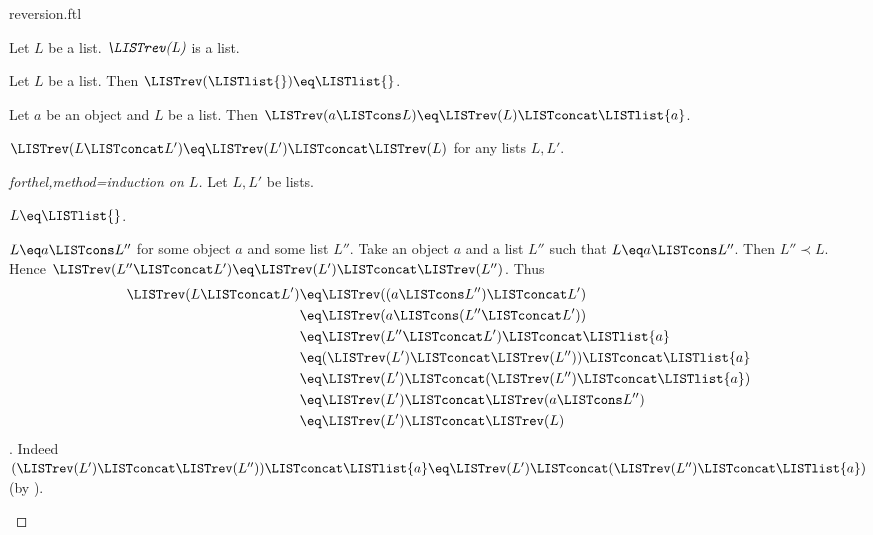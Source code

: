\documentclass{naproche-library}
\begin{document}
\begin{smodule}[title=Reversion]{reversion.ftl}

\begin{signature}[forthel,id=LISTS_REV_4578620297183232]
  Let $L$ be a list.
  $\emph{\LISTrev(L)}$ is a list.
\end{signature}

\begin{axiom}[forthel,id=LISTS_REV_3703161885818880]
  Let $L$ be a list.
  Then $\LISTrev(\LISTlist{}) \eq \LISTlist{}$.
\end{axiom}

\begin{axiom}[forthel,id=LISTS_REV_8050301789536256]
  Let $a$ be an object and $L$ be a list.
  Then $\LISTrev(a \LISTcons L) \eq \LISTrev(L) \LISTconcat \LISTlist{a}$.
\end{axiom}

\begin{proposition}[forthel,id=LISTS_REV_4512036658964875]
  $\LISTrev(L \LISTconcat L') \eq \LISTrev(L') \LISTconcat \LISTrev(L)$ for any lists $L, L'$.
\end{proposition}
\begin{proof}[forthel,method=induction on $L$]
  Let $L,L'$ be lists.

  \begin{case}{$L \eq \LISTlist{}$.} \end{case}

  \begin{case}{$L \eq a \LISTcons L''$ for some object $a$ and some list $L''$.}
    Take an object $a$ and a list $L''$ such that $L \eq a \LISTcons L''$.
    Then $L'' \prec L$.
    Hence $\LISTrev(L'' \LISTconcat L') \eq \LISTrev(L') \LISTconcat \LISTrev(L'')$.
    Thus
    \begin{align*}
      \LISTrev(L \LISTconcat L')
        &\eq \LISTrev((a \LISTcons L'') \LISTconcat L')\\
        &\eq \LISTrev(a \LISTcons (L'' \LISTconcat L'))\\
        &\eq \LISTrev(L'' \LISTconcat L') \LISTconcat \LISTlist{a}\\
        &\eq (\LISTrev(L') \LISTconcat \LISTrev(L'')) \LISTconcat \LISTlist{a}\\
        &\eq \LISTrev(L') \LISTconcat (\LISTrev(L'') \LISTconcat \LISTlist{a})\\
        &\eq \LISTrev(L') \LISTconcat \LISTrev(a \LISTcons L'')\\
        &\eq \LISTrev(L') \LISTconcat \LISTrev(L)
    \end{align*}.
    Indeed $(\LISTrev(L') \LISTconcat \LISTrev(L'')) \LISTconcat \LISTlist{a} \eq \LISTrev(L') \LISTconcat (\LISTrev(L'') \LISTconcat \LISTlist{a})$ (by ).
  \end{case}
\end{proof}


\end{smodule}
\end{document}
